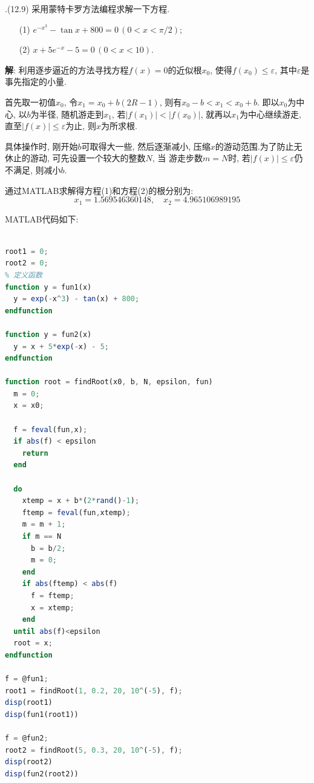 \documentclass{ctexart}
\newcounter{mycnt}
\newenvironment{problem}[1][1.1]{\noindent \stepcounter{mycnt}\themycnt.(#1)}{

}
\newenvironment{answer}{\textbf{解}:}{
\vspace{0.5cm}
}
\begin{document}
\begin{problem}[12.9]
  采用蒙特卡罗方法编程求解一下方程.
  \begin{enumerate}
  \item[(1)] $e^{-x^3}-\tan x + 800 = 0 \,(0 < x < \pi / 2)$;
  \item[(2)] $x + 5e^{-x} - 5 = 0 \, (0 < x < 10)$.
  \end{enumerate}
\end{problem}

\begin{answer}
利用逐步逼近的方法寻找方程$f(x) = 0$的近似根$x_0$, 使得$f(x_0) \leq \varepsilon$, 其中$\varepsilon$是事先指定的小量.

首先取一初值$x_0$, 令$x_1 = x_0 + b(2R-1)$, 则有$x_0 -b < x_1 < x_0 + b$. 即以$x_0$为中心, 以$b$为半径, 随机游走到$x_1$, 若$|f(x_1)| < |f(x_0)|$, 就再以$x_1$为中心继续游走, 直至$|f(x)| \leq \varepsilon$为止, 则$x$为所求根.

具体操作时, 刚开始$b$可取得大一些, 然后逐渐减小, 压缩$x$的游动范围.为了防止无休止的游动, 可先设置一个较大的整数$N$, 当 游走步数$m = N$时, 若$|f(x)| \leq \varepsilon$仍不满足, 则减小$b$.

通过MATLAB求解得方程(1)和方程(2)的根分别为:
\begin{equation}
  x_1 = 1.569546360148, \quad x_2 = 4.965106989195
\end{equation}

MATLAB代码如下:
\begin{lstlisting}[language=Octave]
% 第五题 采用蒙特卡罗法解方程

root1 = 0;
root2 = 0;
% 定义函数
function y = fun1(x)
  y = exp(-x^3) - tan(x) + 800;
endfunction

function y = fun2(x)
  y = x + 5*exp(-x) - 5;
endfunction

function root = findRoot(x0, b, N, epsilon, fun)
  m = 0;
  x = x0;

  f = feval(fun,x);
  if abs(f) < epsilon
    return
  end
  
  do
    xtemp = x + b*(2*rand()-1);
    ftemp = feval(fun,xtemp);
    m = m + 1;
    if m == N
      b = b/2;
      m = 0;
    end
    if abs(ftemp) < abs(f)
      f = ftemp;
      x = xtemp;
    end
  until abs(f)<epsilon
  root = x;
endfunction

f = @fun1;
root1 = findRoot(1, 0.2, 20, 10^(-5), f);
disp(root1)
disp(fun1(root1))

f = @fun2;
root2 = findRoot(5, 0.3, 20, 10^(-5), f);
disp(root2)
disp(fun2(root2))
\end{lstlisting}
\end{answer}
\end{document}
